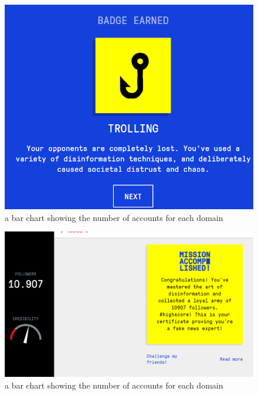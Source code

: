 \documentclass[12pt]{article}
\begin{document}
\begin{figure}[H]
            \centering
            \includegraphics[trim=0 0 0 0, clip, width=\textwidth] {sixthBadge.PNG}
            \caption{ a bar chart showing the number of accounts for each domain}
            \label{fig:6}
\end{figure}
\begin{figure}[H]
            \centering
            \includegraphics[trim=0 0 0 0, clip, width=\textwidth] {final.PNG}
            \caption{ a bar chart showing the number of accounts for each domain}
            \label{fig:7}
\end{figure}
\end{document}

